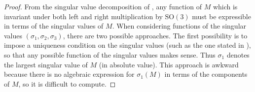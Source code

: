 \begin{proof}
From the singular value decomposition of , any function of $M$ which is invariant under both left and right multiplication by $\mathrm{SO}(3)$ must be expressible in terms of the singular values of $M$. When considering functions of the singular values $(\sigma_{1},\sigma_{2},\sigma_{3})$, there are two possible approaches. The first possibility is to impose a uniqueness condition on the singular values (such as the one stated in ), so that any possible function of the singular values makes sense. Thus $\sigma_{1}$ denotes the largest singular value of $M$ (in absolute value). This approach is awkward because there is no algebraic expression for $\sigma_{1}(M)$ in terms of the components of $M$, so it is difficult to compute. 


\end{proof}
